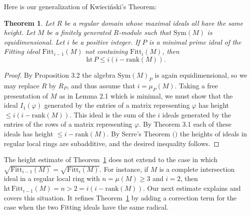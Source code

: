 \documentclass{proc-l}
\newcommand{\rank}{\mathrm{rank}}
\newcommand{\Fitt}{\mathrm{Fitt}}
\newcommand{\hgt}{\mathrm{ht}}
\newcommand{\Sym}{\mathrm{ Sym}}
\newcommand{\rad}{\sqrt}
\newtheorem{Theorem}{Theorem}[section]
\theoremstyle{remark}
\theoremstyle{definition}
\begin{document}
Here is our generalization of Kwieci\'nski's Theorem:

\begin{Theorem}\label{Theorem2.3} 
Let $R$ be a regular domain whose maximal ideals
all have the same height. Let $M$ be a finitely generated
$R$-module such that $\Sym(M)$ is equidimensional.  Let $i$ be a
positive integer. If $P$ is a minimal prime ideal of the Fitting
ideal
$\Fitt_{i-1}(M)$ not containing
$\Fitt_i(M)$, then 
\begin{equation*}\hgt \, P \leq i(i-\rank(M)).\end{equation*}
\end{Theorem}
\begin{proof}
By Proposition 3.2 the algebra $\Sym(M)_P$ is
again equidimensional, so we may replace $R$ by
$R_P$, and thus assume that $i = \mu_P(M)$. Taking a free presentation
of
$M$ as in Lemma 2.1 which is minimal, 
we must show that the ideal $I_1(\varphi)$ generated
by the entries of a matrix representing $\varphi$ has height $\leq
i(i-\rank(M))$.  This ideal is the sum of the $i$ ideals generated by
the entries of the rows of a matrix representing $\varphi$. By Theorem 3.1
each of these ideals has height $\leq i-\rank(M)$.  By Serre's Theorem
$($\cite[Theorem 3, p.~V--18]{S}$)$ the heights of ideals in regular
local rings are subadditive, and the desired inequality follows.
\end{proof}


The height estimate of Theorem~\ref{Theorem2.3} does not extend to the 
case in which
$\rad{\mathrm{ Fitt}_{i-1}(M)} = \rad{\mathrm{ Fitt}_{i}(M)}$. For instance, if $M$ 
is a complete intersection ideal in a regular local ring with $n =
\mu(M)\geq 3$ and  $i = 2$, then $\hgt\, \mathrm{ Fitt}_{i-1}(M) = n > 2 =
i(i-\rank(M))$.
Our next estimate explains and covers this situation. 
It refines Theorem~\ref{Theorem2.3} by adding a correction term
for the case when the two Fitting ideals have the same radical.
\end{document}
